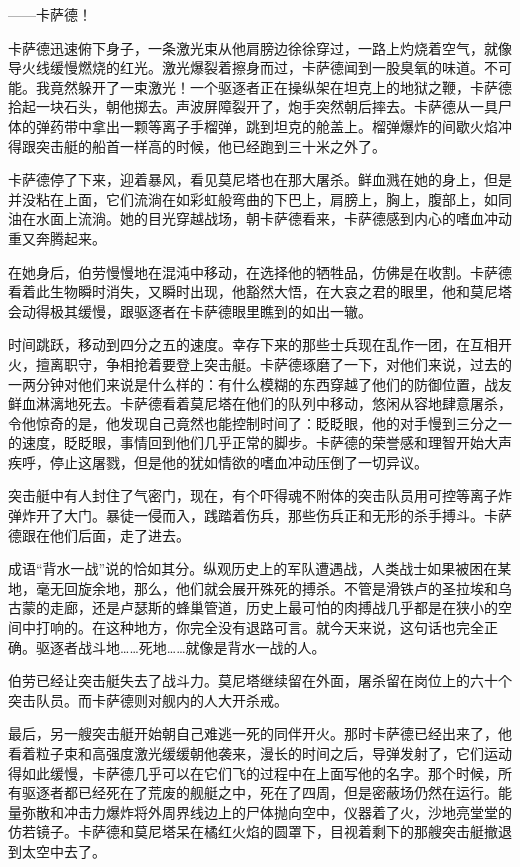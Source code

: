 \documentclass[AutoFakeBold=true]{book}
\begin{document}
{\kaishu ——卡萨德！}

卡萨德迅速俯下身子，一条激光束从他肩膀边徐徐穿过，一路上灼烧着空气，就像导火线缓慢燃烧的红光。激光爆裂着擦身而过，卡萨德闻到一股臭氧的味道。{\kaishu 不可能。我竟然躲开了一束激光！}一个驱逐者正在操纵架在坦克上的地狱之鞭，卡萨德拾起一块石头，朝他掷去。声波屏障裂开了，炮手突然朝后摔去。卡萨德从一具尸体的弹药带中拿出一颗等离子手榴弹，跳到坦克的舱盖上。榴弹爆炸的间歇火焰冲得跟突击艇的船首一样高的时候，他已经跑到三十米之外了。

卡萨德停了下来，迎着暴风，看见莫尼塔也在那大屠杀。鲜血溅在她的身上，但是并没粘在上面，它们流淌在如彩虹般弯曲的下巴上，肩膀上，胸上，腹部上，如同油在水面上流淌。她的目光穿越战场，朝卡萨德看来，卡萨德感到内心的嗜血冲动重又奔腾起来。

在她身后，伯劳慢慢地在混沌中移动，在选择他的牺牲品，仿佛是在收割。卡萨德看着此生物瞬时消失，又瞬时出现，他豁然大悟，在大哀之君的眼里，他和莫尼塔会动得极其缓慢，跟驱逐者在卡萨德眼里瞧到的如出一辙。

时间跳跃，移动到四分之五的速度。幸存下来的那些士兵现在乱作一团，在互相开火，擅离职守，争相抢着要登上突击艇。卡萨德琢磨了一下，对他们来说，过去的一两分钟对他们来说是什么样的：有什么模糊的东西穿越了他们的防御位置，战友鲜血淋漓地死去。卡萨德看着莫尼塔在他们的队列中移动，悠闲从容地肆意屠杀，令他惊奇的是，他发现自己竟然也能控制时间了：眨眨眼，他的对手慢到三分之一的速度，眨眨眼，事情回到他们几乎正常的脚步。卡萨德的荣誉感和理智开始大声疾呼，停止这屠戮，但是他的犹如情欲的嗜血冲动压倒了一切异议。

突击艇中有人封住了气密门，现在，有个吓得魂不附体的突击队员用可控等离子炸弹炸开了大门。暴徒一侵而入，践踏着伤兵，那些伤兵正和无形的杀手搏斗。卡萨德跟在他们后面，走了进去。

成语``背水一战''说的恰如其分。纵观历史上的军队遭遇战，人类战士如果被困在某地，毫无回旋余地，那么，他们就会展开殊死的搏杀。不管是滑铁卢的圣拉埃和乌古蒙的走廊，还是卢瑟斯的蜂巢管道，历史上最可怕的肉搏战几乎都是在狭小的空间中打响的。在这种地方，你完全没有退路可言。就今天来说，这句话也完全正确。驱逐者战斗地……死地……就像是背水一战的人。

伯劳已经让突击艇失去了战斗力。莫尼塔继续留在外面，屠杀留在岗位上的六十个突击队员。而卡萨德则对舰内的人大开杀戒。

最后，另一艘突击艇开始朝自己难逃一死的同伴开火。那时卡萨德已经出来了，他看着粒子束和高强度激光缓缓朝他袭来，漫长的时间之后，导弹发射了，它们运动得如此缓慢，卡萨德几乎可以在它们飞的过程中在上面写他的名字。那个时候，所有驱逐者都已经死在了荒废的舰艇之中，死在了四周，但是密蔽场仍然在运行。能量弥散和冲击力爆炸将外周界线边上的尸体抛向空中，仪器着了火，沙地亮堂堂的仿若镜子。卡萨德和莫尼塔呆在橘红火焰的圆罩下，目视着剩下的那艘突击艇撤退到太空中去了。
\end{document}
